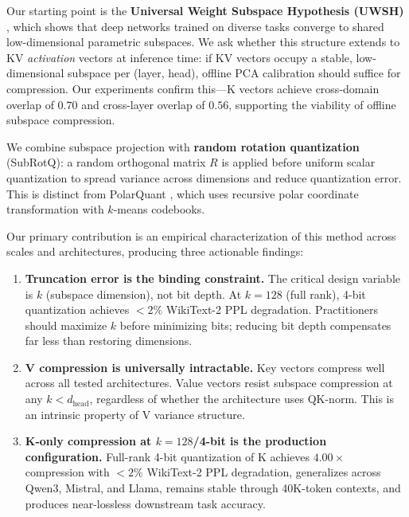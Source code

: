 \documentclass{article}
\begin{document}
Our starting point is the \textbf{Universal Weight Subspace Hypothesis (UWSH)}
\cite{kaushik2025uwsh}, which shows that deep networks trained on diverse tasks
converge to shared low-dimensional parametric subspaces. We ask whether this
structure extends to KV \emph{activation} vectors at inference time: if KV vectors
occupy a stable, low-dimensional subspace per (layer, head), offline PCA
calibration should suffice for compression. Our experiments confirm this---K
vectors achieve cross-domain overlap of $0.70$ and cross-layer overlap of $0.56$,
supporting the viability of offline subspace compression.

We combine subspace projection with \textbf{random rotation quantization} (SubRotQ):
a random orthogonal matrix $R$ is applied before uniform scalar quantization to
spread variance across dimensions and reduce quantization error. This is distinct
from PolarQuant \cite{han2025polarquant}, which uses recursive polar coordinate
transformation with $k$-means codebooks.

Our primary contribution is an empirical characterization of this method across
scales and architectures, producing three actionable findings:

\begin{enumerate}[leftmargin=1.5em, itemsep=2pt]
  \item \textbf{Truncation error is the binding constraint.} The critical design
    variable is $k$ (subspace dimension), not bit depth. At $k{=}128$ (full rank),
    4-bit quantization achieves $<2\%$ WikiText-2 PPL degradation. Practitioners
    should maximize $k$ before minimizing bits; reducing bit depth compensates far
    less than restoring dimensions.
  \item \textbf{V compression is universally intractable.} Key vectors compress
    well across all tested architectures. Value vectors resist subspace compression
    at any $k < d_\text{head}$, regardless of whether the architecture uses QK-norm.
    This is an intrinsic property of V variance structure.
  \item \textbf{K-only compression at $k{=}128$/4-bit is the production
    configuration.} Full-rank 4-bit quantization of K achieves $4.00{\times}$
    compression with $<2\%$ WikiText-2 PPL degradation, generalizes across Qwen3,
    Mistral, and Llama, remains stable through 40K-token contexts, and produces
    near-lossless downstream task accuracy.
\end{enumerate}

\end{document}
